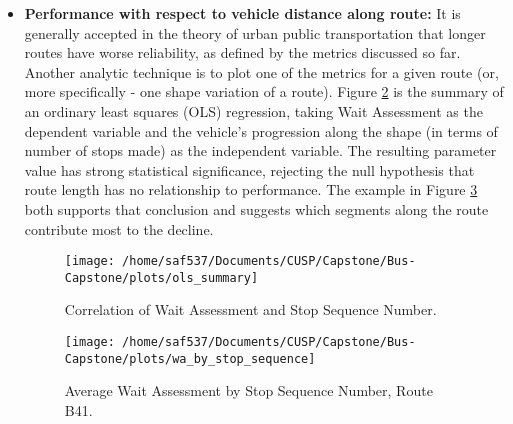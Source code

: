 \documentclass[12pt]{report}
\begin{document}
\begin{itemize}
One example descriptive analysis is to plot the distribution of normalized running time variances. Visible in this example, Figure \ref{adh}, is both the central tendency -- slightly positive -- and the wide spread of the distribution, indicating very inconsistent running time adherence.  Strategies to reduce the inconsistency are not in the scope of this project.




\begin{figure}[!ht]
  \caption{Running time adherence.}
  \label{adh}
  \centering
    \texttt{[image: /home/saf537/Documents/CUSP/Capstone/Bus-Capstone/plots/running\_time\_adherence]}
\end{figure}


\item \textbf{Performance with respect to vehicle distance along route:} It is generally accepted in the theory of urban public transportation that longer routes have worse reliability, as defined by the metrics discussed so far.  Another analytic technique is to plot one of the metrics for a given route (or, more specifically - one shape variation of a route). Figure \ref{ols} is the summary of an ordinary least squares (OLS) regression, taking Wait Assessment as the dependent variable and the vehicle's progression along the shape (in terms of number of stops made) as the independent variable.  The resulting parameter value has strong statistical significance, rejecting the null hypothesis that route length has no relationship to performance.  The example in Figure \ref{wastop} both supports that conclusion and suggests which segments along the route contribute most to the decline.

\begin{figure}[!ht]
  \caption{Correlation of Wait Assessment and Stop Sequence Number.}
  \label{ols}
  \centering
    \texttt{[image: /home/saf537/Documents/CUSP/Capstone/Bus-Capstone/plots/ols\_summary]}
\end{figure}


\begin{figure}[!ht]
  \caption{Average Wait Assessment by Stop Sequence Number, Route B41.}
  \label{wastop}
  \centering
    \texttt{[image: /home/saf537/Documents/CUSP/Capstone/Bus-Capstone/plots/wa\_by\_stop\_sequence]}
\end{figure}


\end{itemize}
\end{document}
